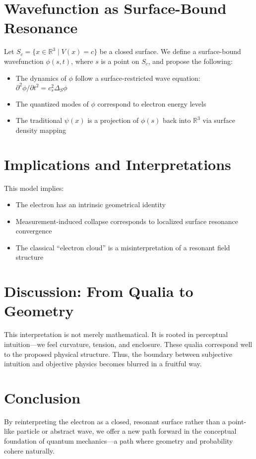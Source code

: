 \documentclass[12pt]{article}
\begin{document}
\section{Wavefunction as Surface-Bound Resonance}
Let $S_c = \{x \in \mathbb{R}^3 \mid V(x) = c\}$ be a closed surface. We define a surface-bound wavefunction $\phi(s,t)$, where $s$ is a point on $S_c$, and propose the following:
\begin{itemize}
  \item The dynamics of $\phi$ follow a surface-restricted wave equation: $\partial^2 \phi / \partial t^2 = c_s^2 \Delta_{S} \phi$
  \item The quantized modes of $\phi$ correspond to electron energy levels
  \item The traditional $\psi(x)$ is a projection of $\phi(s)$ back into $\mathbb{R}^3$ via surface density mapping
\end{itemize}

\section{Implications and Interpretations}
This model implies:
\begin{itemize}
  \item The electron has an intrinsic geometrical identity
  \item Measurement-induced collapse corresponds to localized surface resonance convergence
  \item The classical ``electron cloud'' is a misinterpretation of a resonant field structure
\end{itemize}

\section{Discussion: From Qualia to Geometry}
This interpretation is not merely mathematical. It is rooted in perceptual intuition---we feel curvature, tension, and enclosure. These qualia correspond well to the proposed physical structure. Thus, the boundary between subjective intuition and objective physics becomes blurred in a fruitful way.

\section{Conclusion}
By reinterpreting the electron as a closed, resonant surface rather than a point-like particle or abstract wave, we offer a new path forward in the conceptual foundation of quantum mechanics---a path where geometry and probability cohere naturally.
\end{document}
